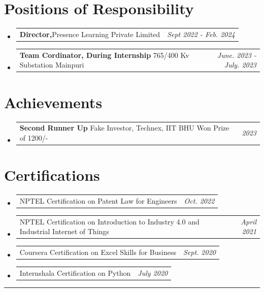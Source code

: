 \documentclass[a4paper,11pt]{article}
\makeatletter
\newcommand{\resumePOR}[3]{
\vspace{0.5mm}\item
    \begin{tabular*}{0.97\textwidth}[t]{l@{\extracolsep{\fill}}r}
        \textbf{#1}\hspace{0.3mm}#2 & \textit{\small{#3}} 
    \end{tabular*}
    \vspace{-2mm}
}
\newcommand{\resumeSubHeadingListStart}{\begin{itemize}[leftmargin=*,labelsep=0mm]}
\newcommand{\resumeSubHeadingListEnd}{\end{itemize}\vspace{2mm}}
\makeatother
\begin{document}
\section{\textcolor{headingColor}{\textbf{Positions of Responsibility}}}
\vspace{-0.4mm}
\resumeSubHeadingListStart
\resumePOR{Director,} %
    {Presence Learning Private Limited} %
    {Sept 2022 - Feb. 2024} %
\resumePOR{Team Cordinator, During Internship} %
    { 765/400 Kv Substation Mainpuri} %
    {June. 2023 - July. 2023} %
\resumeSubHeadingListEnd
\vspace{-4mm}


\section{\textcolor{headingColor}{\textbf{Achievements}}}
\vspace{-0.4mm}
\resumeSubHeadingListStart
\resumePOR{Second Runner Up } %
    {Fake Investor, Technex, IIT BHU Won Prize of 1200/- } %
    {2023} %
    
    

\resumeSubHeadingListEnd
\vspace{-4mm}

\section{\textcolor{headingColor}{\textbf{Certifications}}}
\vspace{-0.2mm}
\resumeSubHeadingListStart
\resumePOR{}{
NPTEL Certification on Patent Law for Engineers
}{Oct. 2022}

\resumePOR{}{
NPTEL Certification on Introduction to Industry 4.0 and Industrial Internet of Things
}{April 2021}
\resumePOR{}{
Coursera Certification on Excel Skills for Business
}{Sept. 2020}
\resumePOR{}{
Internshala Certification on Python
}{July 2020}
\resumeSubHeadingListEnd



\hspace*{-5mm}\rule{1.035\textwidth}{0.1mm}

\end{document}
